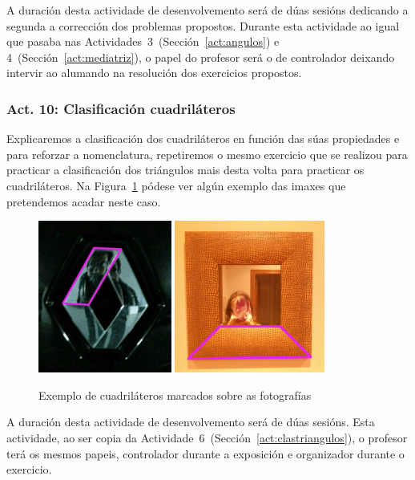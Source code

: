 
A duración desta actividade de desenvolvemento será de dúas sesións dedicando a segunda a corrección dos problemas propostos. Durante esta actividade ao igual que pasaba nas Actividades~3~(Sección~\ref{act:angulos}) e 4~(Sección~\ref{act:mediatriz}), o papel do profesor será o de controlador deixando intervir ao alumando na resolución dos exercicios propostos.

\subsubsection{Act. 10: Clasificación cuadriláteros}\label{act:cuadrilateros}
Explicaremos a clasificación dos cuadriláteros en función das súas propiedades e para reforzar a nomenclatura, repetiremos o mesmo exercicio que se realizou para practicar a clasificación dos triángulos mais desta volta para practicar os cuadriláteros. Na Figura~\ref{fig:act11} pódese ver algún exemplo das imaxes que pretendemos acadar neste caso.

\begin{figure}[h!]
  \centering
  \includegraphics[height=5cm]{img/cuad1.jpg}
  \includegraphics[height=5cm]{img/cuad2.jpg}
  \caption{Exemplo de cuadriláteros marcados sobre as fotografías}\label{fig:act11}
\end{figure}

A duración desta actividade de desenvolvemento será de dúas sesións. Esta actividade, ao ser copia da Actividade~6~(Sección~\ref{act:clastriangulos}), o profesor terá os mesmos papeis, controlador durante a exposición e organizador durante o exercicio.


